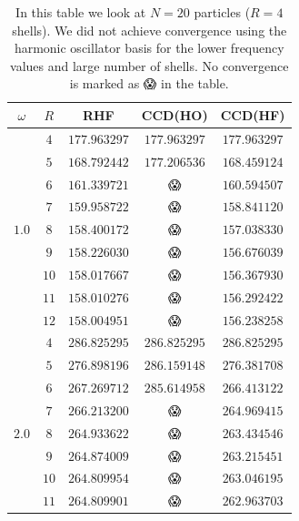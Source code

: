 \documentclass[
    a4paper, aps, twocolumn, floatfix, superscriptaddress,
    nofootinbib]{revtex4-1}
\newcommand{\nan}{{\DejaSans 😱}}
\newcommand{\1}{\mathds{1}}
\begin{document}
        \begin{table}
            \centering
            \caption{In this table we look at $N = 20$ particles ($R = 4$
            shells).  We did not achieve convergence using the harmonic
            oscillator basis for the lower frequency values and large number of
            shells. No convergence is marked as {\nan} in the table.}
            \begin{ruledtabular}
                \begin{tabular}{c|c|ccc}
                    $\omega$ & $R$ & RHF & CCD(HO) & CCD(HF) \\
                    \hline
                          & $4$ & $177.963297$ & $177.963297$ & $177.963297$ \\
                          & $5$ & $168.792442$ & $177.206536$ & $168.459124$ \\
                          & $6$ & $161.339721$ & \nan & $160.594507$ \\
                          & $7$ & $159.958722$ & \nan & $158.841120$ \\
                    $1.0$ & $8$ & $158.400172$ & \nan & $157.038330$ \\
                          & $9$ & $158.226030$ & \nan & $156.676039$ \\
                          & $10$ & $158.017667$ & \nan & $156.367930$ \\
                          & $11$ & $158.010276$ & \nan & $156.292422$ \\
                          & $12$ & $158.004951$ & \nan & $156.238258$ \\
                    \hline
                          & $4$ & $286.825295$ & $286.825295$ & $286.825295$ \\
                          & $5$ & $276.898196$ & $286.159148$ & $276.381708$ \\
                          & $6$ & $267.269712$ & $285.614958$ & $266.413122$ \\
                          & $7$ & $266.213200$ & \nan & $264.969415$ \\
                    $2.0$ & $8$ & $264.933622$ & \nan & $263.434546$ \\
                          & $9$ & $264.874009$ & \nan & $263.215451$ \\
                          & $10$ & $264.809954$ & \nan & $263.046195$ \\
                          & $11$ & $264.809901$ & \nan & $262.963703$ \\

\end{tabular}
\end{ruledtabular}
\end{table}
\end{document}
